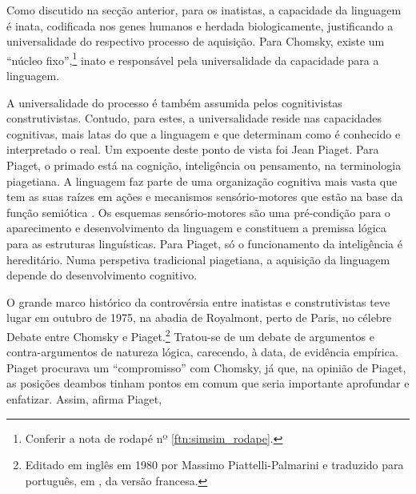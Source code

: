 \documentclass[output=paper]{LSP/langsci}
\begin{document}
Como discutido na secção anterior, para os inatistas, a capacidade da linguagem é inata, codificada nos genes humanos e herdada biologicamente, justificando a universalidade do respectivo processo de aquisição. Para Chomsky, existe um ``núcleo fixo'',\footnote{Conferir a nota de rodapé nº \ref{ftn:simsim_rodape}.} inato e responsável pela universalidade da capacidade para a linguagem. 

A universalidade do processo é também assumida pelos cognitivistas construtivistas. Contudo, para estes, a universalidade reside nas capacidades cognitivas, mais latas do que a linguagem e que determinam como é conhecido e interpretado o real. Um expoente deste ponto de vista foi Jean Piaget. Para Piaget, o primado está na cognição, inteligência ou pensamento, na terminologia piagetiana. A linguagem faz parte de uma organização cognitiva mais vasta que tem as suas raízes em ações e mecanismos sensório-motores que estão na base da função semiótica \citep{piagetinhelder1966}. Os esquemas sensório-motores são uma pré-condição para o aparecimento e desenvolvimento da linguagem e constituem a premissa lógica para as estruturas linguísticas. Para Piaget, só o funcionamento da inteligência é hereditário. Numa perspetiva tradicional piagetiana, a aquisição da linguagem depende do desenvolvimento cognitivo. 

O grande marco histórico da controvérsia entre inatistas e construtivistas teve lugar em outubro de 1975, na abadia de Royalmont, perto de Paris, no célebre Debate entre Chomsky e Piaget.\footnote{Editado em inglês em 1980 por Massimo Piattelli-Palmarini e traduzido para português, em \citeyear{piattelli-palmarini1987}, da versão francesa.} Tratou-se de um debate de argumentos e contra-argumentos de natureza lógica, carecendo, à data, de evidência empírica. Piaget procurava um ``compromisso'' com Chomsky, já que, na opinião de Piaget, as posições de\largerpage ambos tinham pontos em comum que seria importante aprofundar e enfatizar. Assim, afirma Piaget,
\end{document}
